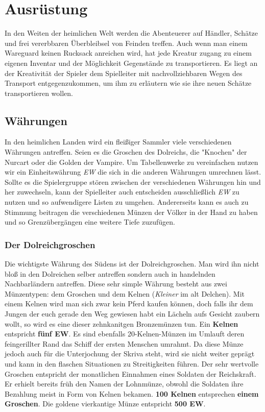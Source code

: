 \chapter{Ausrüstung} \label{Ausrüstung}
In den Weiten der heimlichen Welt werden die Abenteuerer auf Händler, Schätze und frei vererbbaren Überbleibsel von Feinden treffen. Auch wenn man einem Wareguard keinen Rucksack anreichen wird, hat jede Kreatur zugang zu einem eigenen Inventar und der Möglichkeit Gegenstände zu transportieren. Es liegt an der Kreativität der Spieler dem Spielleiter mit nachvollziehbaren Wegen des Transport entgegenzukommen, um ihm zu erläutern wie sie ihre neuen Schätze transportieren wollen.

\section{Währungen}
In den heimlichen Landen wird ein fleißiger Sammler viele verschiedenen Währungen antreffen. Seien es die Groschen des Dolreichs, die "Knochen" der Nurcart oder die Golden der Vampire. Um Tabellenwerke zu vereinfachen nutzen wir ein Einheitswährung \textit{EW} die sich in die anderen Währungen umrechnen lässt. Sollte es die Spielergruppe stören zwischen der verschiedenen Währungen hin und her zuwechseln, kann der Spielleiter auch entscheiden ausschließlich \textit{EW} zu nutzen und so aufwendigere Listen zu umgehen. Andererseits kann es auch zu Stimmung beitragen die verschiedenen Münzen der Völker in der Hand zu haben und so Grenzübergängen eine weitere Tiefe zuzufügen.

\subsection*{Der Dolreichgroschen}
Die wichtigste Währung des Südens ist der Dolreichgroschen. Man wird ihn nicht bloß in den Dolreichen selber antreffen sondern auch in handelnden Nachbarländern antreffen. Diese sehr simple Währung besteht aus zwei Münzentypen: dem Groschen und dem Kelnen (\textit{Kleiner} im alt Delchen). Mit einem Kelnen wird man sich zwar kein Pferd kaufen können, doch falls ihr dem Jungen der euch gerade den Weg gewiesen habt ein Lächeln aufs Gesicht zaubern wollt, so wird es eine dieser zehnkanitgen Bronzemünzen tun. Ein \textbf{Kelnen} entspricht \textbf{fünf EW}. Es sind ebenfalls 20-Kelnen-Münzen im Umlauft deren feingerillter Rand das Schiff der ersten Menschen umrahmt. Da diese Münze jedoch auch für die Unterjochung der Skriva steht, wird sie nicht weiter geprägt und kann in den flaschen Situationen zu Streitigkeiten führen.
Der sehr wertvolle Groschen entspricht der monatlichen Einnahmen eines Soldaten der Reichskraft. Er erhielt bereits früh den Namen der Lohnmünze, obwohl die Soldaten ihre Bezahlung meist in Form von Kelnen bekamen. \textbf{100 Kelnen} entsprechen \textbf{einem Groschen}. Die goldene vierkantige Münze entspricht \textbf{500 EW}.

